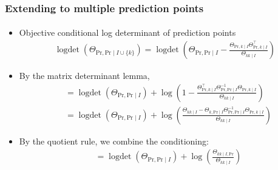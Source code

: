 \documentclass{beamer}                             %
\DeclareMathOperator{\logdet}{logdet}
\begin{document}
\begin{frame}
\frametitle{Extending to multiple prediction points}
\framesubtitle{}
\begin{itemize}
  \item<+-> Objective conditional log determinant of prediction points
    \begin{align*}
      \logdet
      \left (
        \Theta_{\text{Pr}, \text{Pr} \mid I \cup \{ k \}}
      \right ) = \logdet
        \left (
          \Theta_{\text{Pr}, \text{Pr} \mid I} -
          \frac{\Theta_{\text{Pr}, k \mid I}
                \Theta_{\text{Pr}, k \mid I}^{\top}
              }{\Theta_{kk \mid I}}
        \right )
    \end{align*}
  \item<+-> By the matrix determinant lemma,
    \begin{align*}
      &= \logdet \left ( \Theta_{\text{Pr}, \text{Pr} \mid I} \right ) +
        \log
        \left (
          1 -
          \frac{\Theta_{\text{Pr}, k \mid I}^{\top}
                \Theta_{\text{Pr}, \text{Pr} \mid I}^{-1}
                \Theta_{\text{Pr}, k \mid I}
              }{\Theta_{kk \mid I}}
        \right ) \\
      &= \logdet \left ( \Theta_{\text{Pr}, \text{Pr} \mid I} \right ) +
        \log
        \left (
          \frac{\Theta_{kk \mid I} -
                \Theta_{k, \text{Pr} \mid I}
                \Theta_{\text{Pr}, \text{Pr} \mid I}^{-1}
                \Theta_{\text{Pr}, k \mid I}
              }{\Theta_{kk \mid I}}
        \right )
    \end{align*}
  \item<+-> By the quotient rule, we combine the conditioning:
    \begin{align*}
      &= \logdet \left ( \Theta_{\text{Pr}, \text{Pr} \mid I} \right ) +
        \log
        \left (
          \frac{\Theta_{kk \mid I, \text{Pr}}}{\Theta_{kk \mid I}}
        \right )
    \end{align*}
\end{itemize}
\end{frame}
\end{document}

